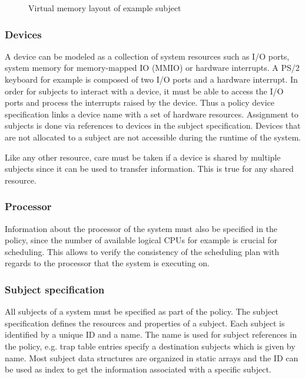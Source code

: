 \begin{figure}[h]
	\centering
	
	\caption{Virtual memory layout of example subject}
	\label{fig:virt-mem-layout-example}
\end{figure}

\subsubsection{Devices}
A device can be modeled as a collection of system resources such as I/O ports,
system memory for memory-mapped IO (MMIO) or hardware interrupts. A PS/2
keyboard for example is composed of two I/O ports and a hardware interrupt.  In
order for subjects to interact with a device, it must be able to access the I/O
ports and process the interrupts raised by the device. Thus a policy device
specification links a device name with a set of hardware resources. Assignment
to subjects is done via references to devices in the subject specification.
Devices that are not allocated to a subject are not accessible during the
runtime of the system.

Like any other resource, care must be taken if a device is shared by multiple
subjects since it can be used to transfer information. This is true for any
shared resource.

\subsubsection{Processor}
Information about the processor of the system must also be specified in the
policy, since the number of available logical CPUs for example is crucial for
scheduling. This allows to verify the consistency of the scheduling plan with
regards to the processor that the system is executing on.

\subsubsection{Subject specification}
All subjects of a system must be specified as part of the policy. The subject
specification defines the resources and properties of a subject. Each subject is
identified by a unique ID and a name. The name is used for subject references in
the policy, e.g. trap table entries specify a destination subjects which is
given by name. Most subject data structures are organized in static arrays and
the ID can be used as index to get the information associated with a specific
subject.

